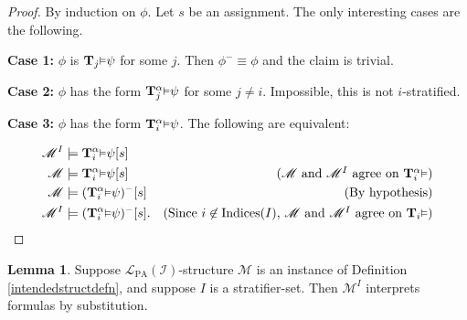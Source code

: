 \documentclass[reqno]{article}
\theoremstyle{definition}
\newtheorem{lemma}[theorem]{Lemma}
\def\L{\mathscr{L}}
\def\M{\mathscr{M}}
\def\T{\mathbf{T}}
\def\indices{\mathrm{Indices}}
\def\LPA{\L_{\mathrm{PA}}}
\def\indset{\mathcal I}
\renewcommand{\Pr}[1]{\T_{#1}\mbox{\small${\vDash}$}}
\newcommand{\Prr}[2]{\T^{#1}_{#2}\mbox{\small${\vDash}$}}
\newcommand{\case}[1]{\textbf{Case #1:}}
\begin{document}
\begin{proof}
    By induction on $\phi$. Let $s$ be an assignment.
    The only interesting cases are the following.

    \item
    \case1
    $\phi$ is $\Pr j\psi$ for some $j$. Then $\phi^-\equiv\phi$ and the claim
    is trivial.

    \item
    \case2
    $\phi$ has the form $\Prr \alpha j\psi$ for some $j\not=i$. Impossible, this is
    not $i$-stratified.

    \item
    \case3
    $\phi$ has the form $\Prr \alpha i \psi$. The following are equivalent:

    \begin{align*}
        \M^I &\models \Prr \alpha i \psi[s]\\
        \M &\models \Prr \alpha i \psi[s]
            &\mbox{($\M$ and $\M^I$ agree on $\Prr \alpha i$)}\\
        \M &\models (\Prr \alpha i \psi)^-[s]
            &\mbox{(By hypothesis)}\\
        \M^I &\models (\Prr \alpha i\psi)^-[s].
            &\mbox{(Since $i\not\in\indices(I)$, $\M$ and $\M^I$ agree on $\Pr i$)}
    \end{align*}
\end{proof}

\begin{lemma}
\label{raisingMtotheIpreservesintent}
Suppose $\LPA(\indset)$-structure $\M$ is an instance of
Definition \ref{intendedstructdefn}, and suppose
$I$ is a stratifier-set.
Then $\M^I$ interprets formulas by substitution.
\end{lemma}
\end{document}
